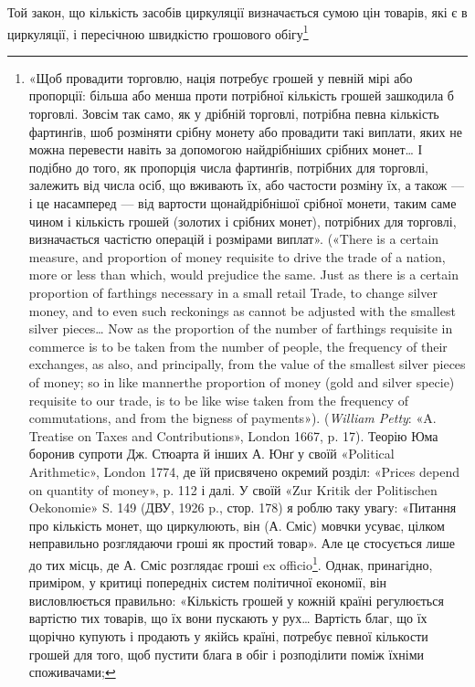 Той закон, що кількість засобів циркуляції визначається
сумою цін товарів, які є в циркуляції, і пересічною швидкістю
грошового обігу\footnote{
«Щоб провадити торговлю, нація потребує грошей у певній мірі
або пропорції: більша або менша проти потрібної кількість грошей зашкодила
б торговлі. Зовсім так само, як у дрібній торговлі, потрібна певна
кількість фартинґів, шоб розміняти срібну монету або провадити такі
виплати, яких не можна перевести навіть за допомогою найдрібніших
срібних монет\dots{} І подібно до того, як пропорція числа фартинґів, потрібних
для торговлі, залежить від числа осіб, що вживають їх, або частости
розміну їх, а також — і це насамперед — від вартости щонайдрібнішої
срібної монети, таким саме чином і кількість грошей (золотих і срібних
монет), потрібних для торговлі, визначається частістю операцій і розмірами
виплат». («There is a certain measure, and proportion of money requisite
to drive the trade of a nation, more or less than which, would prejudice
the same. Just as there is a certain proportion of farthings necessary in a
small retail Trade, to change silver money, and to even such reckonings
as cannot be adjusted with the smallest silver pieces\dots{} Now as the proportion
of the number of farthings requisite in commerce is to be taken from
the number of people, the frequency of their exchanges, as also, and principally,
from the value of the smallest silver pieces of money; so in like mannerthe
proportion of money (gold and silver specie) requisite to our trade,
is to be like wise taken from the frequency of commutations, and from
the bigness of payments»). (\emph{William Petty}: «A. Treatise on Taxes and
Contributions», London 1667, p. 17). Теорію Юма боронив супроти
Дж. Стюарта й інших А. Юнґ у своїй «Political Arithmetic», London
1774, де їй присвячено окремий розділ: «Prices depend on quantity of
money», p. 112 і далі. У своїй «Zur Kritik der Politischen Oekonomie»
S. 149 (ДВУ, 1926 p., стор. 178) я роблю таку увагу: «Питання про кількість
монет, що циркулюють, він (А. Сміс) мовчки усуває, цілком неправильно
розглядаючи гроші як простий товар». Але це стосується лише
до тих місць, де А. Сміс розглядає гроші ex officio\footnote*{
* — з обов’язку. \emph{Peд.}
}. Однак, принагідно,
приміром, у критиці попередніх систем політичної економії, він висловлюється
правильно: «Кількість грошей у кожній країні регулюється вартістю
тих товарів, що їх вони пускають у рух\dots{} Вартість благ, що їх щорічно
купують і продають у якійсь країні, потребує певної кількости грошей
для того, щоб пустити блага в обіг і розподілити поміж їхніми споживачами;
}
